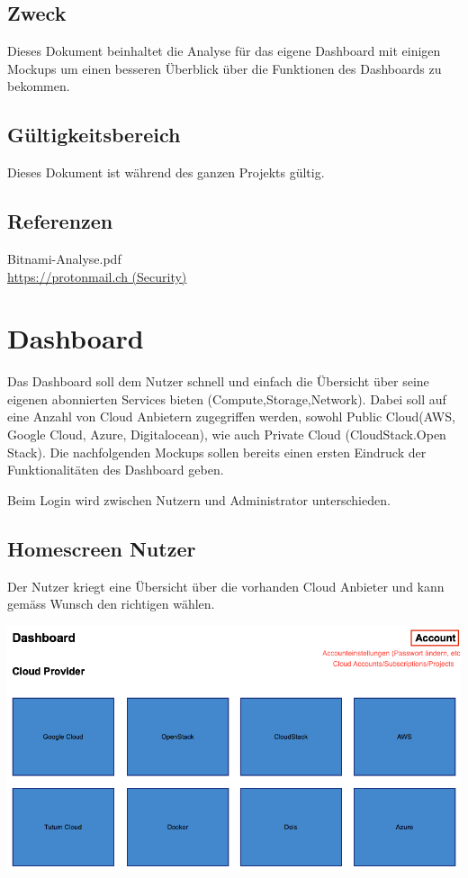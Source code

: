\documentclass[11pt]{scrartcl}
\begin{document}
\subsection{Zweck}

Dieses Dokument beinhaltet die Analyse für das eigene Dashboard mit einigen 
Mockups um einen besseren Überblick über die Funktionen des Dashboards zu 
bekommen.

\subsection{Gültigkeitsbereich}

Dieses Dokument ist während des ganzen Projekts gültig.

\subsection{Referenzen}
Bitnami-Analyse.pdf\\
\href{https://protonmail.ch}{https://protonmail.ch (Security)} 

\section{Dashboard}
Das Dashboard soll dem Nutzer schnell und einfach die Übersicht über seine 
eigenen abonnierten Services bieten (Compute,Storage,Network).
Dabei soll auf eine Anzahl von Cloud Anbietern zugegriffen werden, sowohl Public 
Cloud(AWS, Google Cloud, Azure, Digitalocean), wie auch Private Cloud (CloudStack.Open 
Stack).
Die nachfolgenden Mockups sollen bereits einen ersten Eindruck der 
Funktionalitäten des Dashboard geben.


Beim Login wird zwischen Nutzern und Administrator unterschieden.

\subsection{Homescreen Nutzer}
Der Nutzer kriegt eine Übersicht über die vorhanden Cloud Anbieter und kann 
gemäss Wunsch den richtigen wählen.

\includegraphics[width=\textwidth]{homescreen_user}
\end{document}
